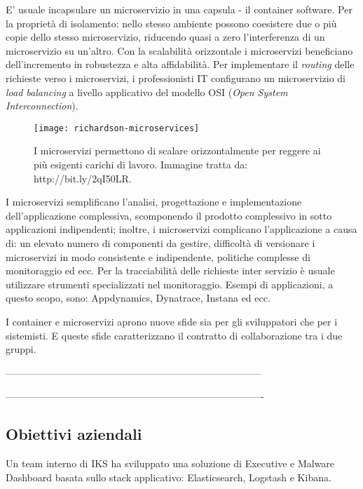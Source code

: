 E' usuale incapsulare un microservizio in una capsula - il container software. 
Per la proprietà di isolamento: nello stesso ambiente possono coesistere due o 
più copie dello stesso microservizio, riducendo quasi a zero l'interferenza di 
un microservizio su un'altro. 
Con la scalabilità orizzontale i microservizi beneficiano dell'incremento in 
robustezza e alta affidabilità. Per implementare il \textit{routing} delle 
richieste verso i microservizi, i professionisti IT configurano un 
microservizio di \textit{load balancing} a livello applicativo del modello OSI 
(\textit{Open System Interconnection}).


\begin{figure}[htbp]
	\begin{center}
		\texttt{[image: richardson-microservices]}
		\caption{I microservizi permettono di scalare orizzontalmente 
per reggere ai più esigenti carichi di lavoro. Immagine tratta da: 
http://bit.ly/2qI50LR.}
	\end{center}
\end{figure}

I microservizi semplificano l'analisi, progettazione e implementazione 
dell'applicazione complessiva, scomponendo il prodotto complessivo in sotto 
applicazioni indipendenti; inoltre, i microservizi complicano l'applicazione a 
causa di: un elevato numero di componenti da gestire, difficoltà di versionare 
i microservizi in modo consistente e indipendente, politiche complesse di 
monitoraggio ed ecc. Per la tracciabilità delle richieste inter servizio è 
usuale utilizzare strumenti specializzati nel monitoraggio. Esempi di 
applicazioni, a questo scopo, sono: Appdynamics, Dynatrace, Instana ed ecc. 

I container e microservizi aprono nuove sfide sia per gli sviluppatori che per 
i sistemisti. E queste sfide caratterizzano il contratto di collaborazione tra 
i due gruppi. 


------------------------------------------------------------------------------

-------------------------------------------------------------------------------

\subsection{Obiettivi aziendali}

Un team interno di IKS ha sviluppato una soluzione di Executive e Malware 
Dashboard
basata sullo stack applicativo: Elasticsearch, Logstash e Kibana.
 
